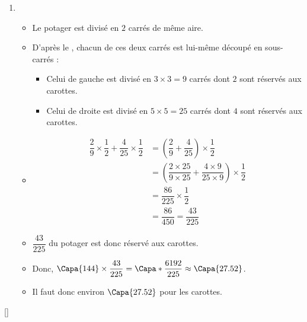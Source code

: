 {{\begin{enumerate}
\begin{itemize}
            \end{itemize}
            \item \begin{itemize}
                \item Le potager est divisé en $2$ carrés de même aire.
                \item D'après le , chacun de ces deux carrés est lui-même découpé en sous-carrés :
                \begin{itemize}
                    \item Celui de gauche est divisé en $3 \times 3 = 9$ carrés dont $2$ sont réservés aux carottes.
                    \item Celui de droite est divisé en $5 \times 5 = 25$ carrés dont $4$ sont réservés aux carottes.
                \end{itemize}
                \item \begin{align*}
                    \dfrac{2}{9} \times \dfrac{1}{2} + \dfrac{4}{25} \times \dfrac{1}{2}
                    &= (\dfrac{2}{9} + \dfrac{4}{25}) \times \dfrac{1}{2}\\
                    &= (\dfrac{2 \times 25}{9 \times 25} + \dfrac{4 \times 9}{25 \times 9}) \times \dfrac{1}{2}\\
                    &= \dfrac{86}{225} \times \dfrac{1}{2}\\
                    &= \dfrac{86}{450}
                    = \dfrac{43}{225}
                \end{align*}
                \item $\dfrac{43}{225}$ du potager est donc réservé aux carottes.
                \item Donc, $\Capa{144} \times \dfrac{43}{225} = \Capa*{\dfrac{6192}{225}} \approx \Capa{27.52}$.
                \item Il faut donc environ $\Capa{27.52}$ pour les carottes.
            \end{itemize}
        \end{enumerate}
    }
}[\mi]